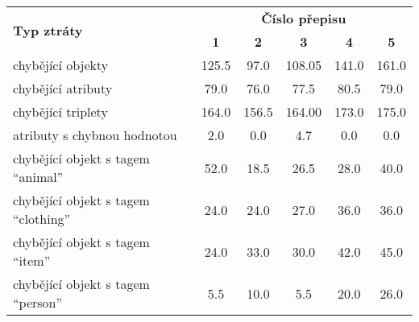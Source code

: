 \begin{table}[ht!]
	\centering
	\begin{tabular}{|l|c|c|c|c|c|}
		\hline
		\multirow{2}{*}{\textbf{Typ ztráty}}                & \multicolumn{5}{c|}{\textbf{Číslo přepisu}}                                                     \\
		\cline{2-6}
		                                                    & \textbf{1}                                  & \textbf{2} & \textbf{3} & \textbf{4} & \textbf{5} \\
		\hline
		chybějící objekty                                   & 125.5                                       & 97.0       & 108.05     & 141.0      & 161.0      \\
		chybějící atributy                                  & 79.0                                        & 76.0       & 77.5       & 80.5       & 79.0       \\
		chybějící triplety                                  & 164.0                                       & 156.5      & 164.00     & 173.0      & 175.0      \\
		atributy s chybnou hodnotou                         & 2.0                                         & 0.0        & 4.7        & 0.0        & 0.0        \\
		\hline
		chybějící objekt s tagem \enquote{animal}           & 52.0                                        & 18.5       & 26.5       & 28.0       & 40.0       \\
		chybějící objekt s tagem \enquote{clothing}         & 24.0                                        & 24.0       & 27.0       & 36.0       & 36.0       \\
		chybějící objekt s tagem \enquote{item}             & 24.0                                        & 33.0       & 30.0       & 42.0       & 45.0       \\
		chybějící objekt s tagem \enquote{person}           & 5.5                                         & 10.0       & 5.5        & 20.0       & 26.0       \\

\end{tabular}
\end{table}
